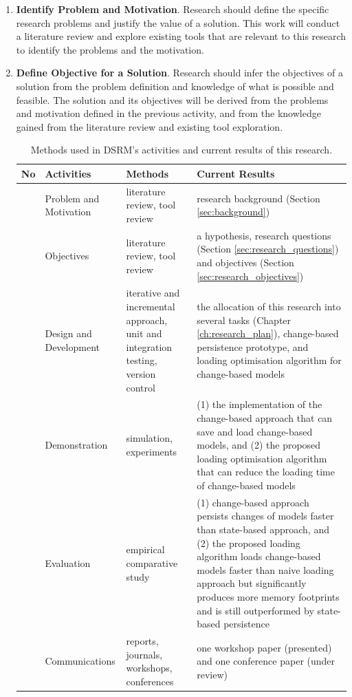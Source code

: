 \documentclass[12pt, a4paper]{report} \usepackage[titletoc]{appendix}
\begin{document}
\begin{enumerate}
    \item \textbf{Identify Problem and Motivation}. Research should define the specific research problems and justify the value of a solution. This work will conduct a literature review and explore existing tools that are relevant to this research to identify the problems and the motivation.
    \item \textbf{Define Objective for a Solution}. Research should infer the objectives of a solution from the problem definition and knowledge of what is possible and feasible. The solution and its objectives will be derived from the problems and motivation defined in the previous activity, and from the knowledge gained from the literature review and existing tool exploration.
   
   \begin{table}[H]
       \centering
       \caption{Methods used in DSRM's activities and current results of this research.}
       \label{table:research_progress}
       \begin{tabular}
           {|>{\centering\arraybackslash}p{0.6cm}|>{\centering\arraybackslash}p{3cm}|>{\centering\arraybackslash}p{3.1cm}|>{\centering\arraybackslash}p{6.5cm}|}
           \hline 
           \textbf{No}&\textbf{Activities}&\textbf{Methods}&\textbf{Current Results}\\
           \hline 
           1 & Problem and Motivation &literature review, tool review & research background (Section \ref{sec:background})\\
           \hline 
           2 & Objectives & literature review, tool review & a hypothesis, research questions (Section \ref{sec:research_questions}) and objectives  (Section \ref{sec:research_objectives})\\
           \hline 
           3 & Design and Development & iterative and incremental approach, unit and integration testing, version control & the allocation of this research into several tasks (Chapter \ref{ch:research_plan}), change-based persistence prototype, and loading optimisation algorithm for change-based models\\
           \hline 
           4 & Demonstration & simulation, experiments  & (1) the implementation of the change-based approach that can save and load change-based models, and (2) the proposed loading optimisation algorithm that can reduce the loading time of change-based models \\
           \hline 
           5 & Evaluation & empirical comparative study & (1) change-based approach persists changes of models faster than state-based approach, and (2) the proposed loading algorithm loads change-based models faster than naive loading approach but significantly produces more memory footprints and is still outperformed by state-based persistence\\
           \hline 
           6 & Communications & reports, journals, workshops, conferences & one workshop paper (presented) and one conference paper (under review)\\
           \hline 
       \end{tabular} 
   \end{table}
    

\end{enumerate}
\end{document}
